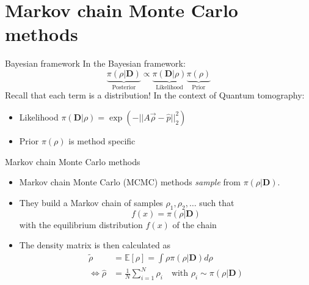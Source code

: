 \documentclass{beamer}
\newcommand{\mb}{\mathbf}
\begin{document}
\section{Markov chain Monte Carlo methods}
\begin{frame}{Bayesian framework}
    In the Bayesian framework:
    \begin{equation}
        \underbrace{\pi (\rho|\mb D)}_{\text{Posterior}} \propto \underbrace{\pi(\mb D|\rho)}_{\text{Likelihood}} \underbrace{\pi(\rho)}_{\text{Prior}}
    \end{equation}
    Recall that each term is a distribution!\medbreak
    In the context of Quantum tomography:
    \begin{itemize}
        \item Likelihood $\pi(\mb D|\rho) = \exp(-||A \vec\rho - \hat p||_2^2)$
        \item Prior $\pi(\rho)$ is method specific
    \end{itemize}
\end{frame}
\begin{frame}{Markov chain Monte Carlo methods}
    \begin{itemize}
        \item Markov chain Monte Carlo (MCMC) methods \textit{sample} from $\pi (\rho|\mb D)$.
        \item They build a Markov chain of samples $\rho_1, \rho_2, \dots$ such that
        \begin{equation}
            f(x) =\pi (\rho|\mb D)
        \end{equation}
        with the equilibrium distribution $f(x)$ of the chain
        \item The density matrix is then calculated as
        \begin{align}
            \tilde \rho &= \mathbb{E}[\rho]= \int \rho \pi(\rho|\mb D) d\rho\\
            \Leftrightarrow \hat \rho &= \frac{1}{N}\sum_{i=1}^N \rho_i \quad \text{with } \rho_i \sim \pi(\rho|\mb D)
        \end{align}
            
    \end{itemize}
\end{frame}
\end{document}

